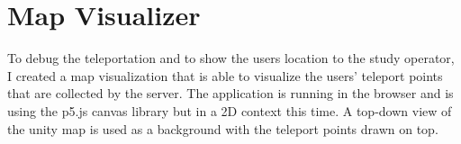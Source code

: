 \section{Map Visualizer}
To debug the teleportation and to show the users location to the study operator, I created a map visualization that is able to visualize the users' teleport points that are collected by the server. The application is running in the browser and is using the p5.js canvas library but in a 2D context this time. A top-down view of the unity map is used as a background with the teleport points drawn on top.
